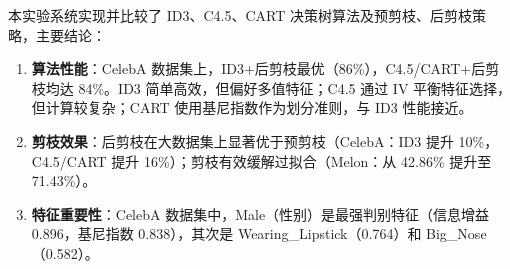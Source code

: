 \documentclass[UTF8]{ctexart}
\begin{document}
本实验系统实现并比较了 ID3、C4.5、CART 决策树算法及预剪枝、后剪枝策略，主要结论：

\begin{enumerate}
    \item \textbf{算法性能}：CelebA 数据集上，ID3+后剪枝最优（86\%），C4.5/CART+后剪枝均达 84\%。ID3 简单高效，但偏好多值特征；C4.5 通过 IV 平衡特征选择，但计算较复杂；CART 使用基尼指数作为划分准则，与 ID3 性能接近。
    
    \item \textbf{剪枝效果}：后剪枝在大数据集上显著优于预剪枝（CelebA：ID3 提升 10\%，C4.5/CART 提升 16\%）；剪枝有效缓解过拟合（Melon：从 42.86\% 提升至 71.43\%）。
    
    \item \textbf{特征重要性}：CelebA 数据集中，Male（性别）是最强判别特征（信息增益 0.896，基尼指数 0.838），其次是 Wearing\_Lipstick（0.764）和 Big\_Nose（0.582）。
    
\end{enumerate}
\end{document}
